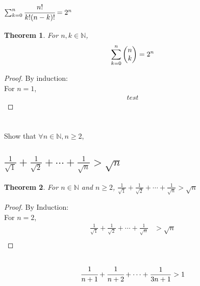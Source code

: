 \documentclass[]{article}
\newcommand{\N}{\mathbb{N}}
\newtheorem{theorem}{Theorem}
\begin{document}
\newpage
\subsubsection{$\sum_{k=0}^{n} \cfrac{n!}{k!(n-k)!} = 2^n$}
\begin{theorem}
    For $n,k \in \N$,
    $$\sum_{k=0}^{n} \mqty(n\\k) = 2^n$$
\end{theorem}
\begin{proof}
    By induction:\\
    For $n=1$,
    \begin{align*}
        test
    \end{align*}
\end{proof}












\newpage
\section{}
Show that $\forall n \in \N, n \geq 2$,

\subsection{
    $\frac{1}{\sqrt{1}} + \frac{1}{\sqrt{2}} + \cdots + \frac{1}{\sqrt{n}} > \sqrt{n}$
}
\begin{theorem}
    For $n \in \N$ and $n \geq 2$,
    $\frac{1}{\sqrt{1}} + \frac{1}{\sqrt{2}} + \cdots + \frac{1}{\sqrt{n}} > \sqrt{n}$
\end{theorem}
\begin{proof}
    By Induction:\\
    For $n=2$,
    \begin{align*}
        \frac{1}{\sqrt{1}} + \frac{1}{\sqrt{2}} + \cdots + \frac{1}{\sqrt{n}} &> \sqrt{n}\\
    \end{align*}
\end{proof}



\subsection{
    $$\cfrac{1}{n+1} + \cfrac{1}{n+2} + \cdots + \frac{1}{3n+1} > 1$$
}
\end{document}
